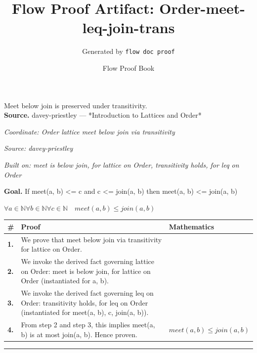 \documentclass[11pt]{article}
\title{Flow Proof Artifact: Order-meet-leq-join-trans}
\author{Generated by \texttt{flow doc proof}}
\date{Flow Proof Book}
\theoremstyle{definition}
\begin{document}
\maketitle
Meet below join is preserved under transitivity.\\[0.5em]
\textbf{Source.} davey-priestley — *Introduction to Lattices and Order*\\[0.5em]
\bigskip
{}\par
\smallskip\noindent\textit{Coordinate: Order \cdot lattice \cdot meet below join via transitivity}\par
\smallskip\noindent\textit{Source: davey-priestley}\par
\smallskip\noindent\textit{Built on: meet is below join, for lattice on Order, transitivity holds, for leq on Order}\par
\medskip
\noindent\textbf{Goal.} If meet(a, b) <= c and c <= join(a, b) then meet(a, b) <= join(a, b)\par
\noindent$\displaystyle \forall a \in \mathbb{N} \forall b \in \mathbb{N} \forall c \in \mathbb{N}\quad meet(a, b) \le join(a, b)$\par
\medskip
\noindent
\begin{tabular}{@{} >{\raggedright\arraybackslash}p{} >{\raggedright\arraybackslash}p{} >{\raggedleft\arraybackslash}p{} @{}}
\textbf{\#} & \textbf{Proof} & \textbf{Mathematics} \\
\midrule
\textbf{1.} & We prove that meet below join via transitivity for lattice on Order. & \\[0.45em]
\textbf{2.} & We invoke the derived fact governing lattice on Order: meet is below join, for lattice on Order (instantiated for a, b). & \\[0.45em]
\textbf{3.} & We invoke the derived fact governing leq on Order: transitivity holds, for leq on Order (instantiated for meet(a, b), c, join(a, b)). & \\[0.45em]
\textbf{4.} & From step 2 and step 3, this implies meet(a, b) is at most join(a, b). Hence proven. & $\displaystyle meet(a, b) \le join(a, b)$ \\[0.45em]
\bottomrule
\end{tabular}
\label{thm:Order-lattice-meet_below_join_via_transitivity}
\par\medskip\hrule
\end{document}
